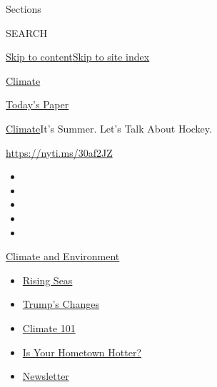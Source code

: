 Sections

SEARCH

\protect\hyperlink{site-content}{Skip to
content}\protect\hyperlink{site-index}{Skip to site index}

\href{https://www.nytimes3xbfgragh.onion/section/climate}{Climate}

\href{https://myaccount.nytimes3xbfgragh.onion/auth/login?response_type=cookie\&client_id=vi}{}

\href{https://www.nytimes3xbfgragh.onion/section/todayspaper}{Today's
Paper}

\href{/section/climate}{Climate}\textbar{}It's Summer. Let's Talk About
Hockey.

\url{https://nyti.ms/30af2JZ}

\begin{itemize}
\item
\item
\item
\item
\item
\end{itemize}

\href{https://www.nytimes3xbfgragh.onion/section/climate?action=click\&pgtype=Article\&state=default\&region=TOP_BANNER\&context=storylines_menu}{Climate
and Environment}

\begin{itemize}
\tightlist
\item
  \href{https://www.nytimes3xbfgragh.onion/2020/07/30/climate/sea-level-inland-floods.html?action=click\&pgtype=Article\&state=default\&region=TOP_BANNER\&context=storylines_menu}{Rising
  Seas}
\item
  \href{https://www.nytimes3xbfgragh.onion/interactive/2020/climate/trump-environment-rollbacks.html?action=click\&pgtype=Article\&state=default\&region=TOP_BANNER\&context=storylines_menu}{Trump's
  Changes}
\item
  \href{https://www.nytimes3xbfgragh.onion/interactive/2020/04/19/climate/climate-crash-course-1.html?action=click\&pgtype=Article\&state=default\&region=TOP_BANNER\&context=storylines_menu}{Climate
  101}
\item
  \href{https://www.nytimes3xbfgragh.onion/interactive/2018/08/30/climate/how-much-hotter-is-your-hometown.html?action=click\&pgtype=Article\&state=default\&region=TOP_BANNER\&context=storylines_menu}{Is
  Your Hometown Hotter?}
\item
  \href{https://www.nytimes3xbfgragh.onion/newsletters/climate-change?action=click\&pgtype=Article\&state=default\&region=TOP_BANNER\&context=storylines_menu}{Newsletter}
\end{itemize}

